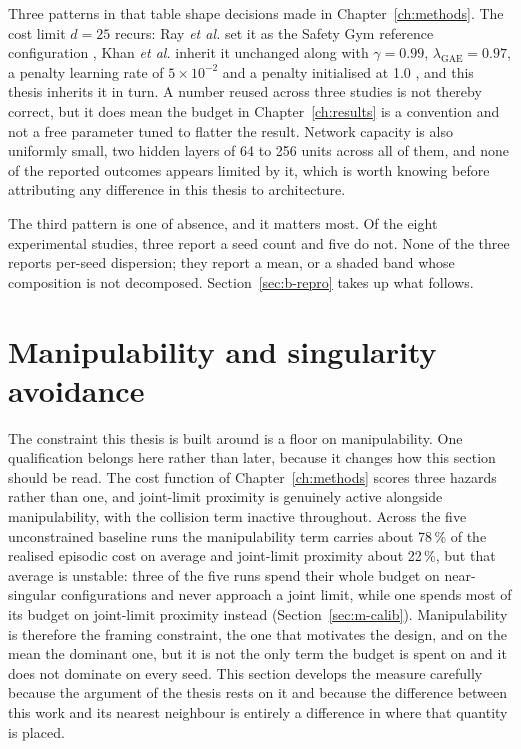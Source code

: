 Three patterns in that table shape decisions made in Chapter~\ref{ch:methods}. The cost limit
\(d=25\) recurs: Ray \emph{et al.} set it as the Safety Gym reference configuration
\cite{ray2019benchmarking}, Khan \emph{et al.} inherit it unchanged along with \(\gamma=0.99\),
\(\lambda_{\mathrm{GAE}}=0.97\), a penalty learning rate of \(5\times10^{-2}\) and a penalty
initialised at 1.0 \cite{khan2026rl_precision_grasping}, and this thesis inherits it in turn. A
number reused across three studies is not thereby correct, but it does mean the budget in
Chapter~\ref{ch:results} is a convention and not a free parameter tuned to flatter the result.
Network capacity is also uniformly small, two hidden layers of 64 to 256 units across all of
them, and none of the reported outcomes appears limited by it, which is worth knowing before
attributing any difference in this thesis to architecture.

The third pattern is one of absence, and it matters most. Of the eight experimental studies,
three report a seed count and five do not. None of the three reports per-seed dispersion; they
report a mean, or a shaded band whose composition is not decomposed. Section~\ref{sec:b-repro}
takes up what follows.

\section{Manipulability and singularity avoidance}\label{sec:b-manip}

The constraint this thesis is built around is a floor on manipulability. One qualification
belongs here rather than later, because it changes how this section should be read. The cost
function of Chapter~\ref{ch:methods} scores three hazards rather than one, and joint-limit
proximity is genuinely active alongside manipulability, with the collision term inactive
throughout. Across the five unconstrained baseline runs the manipulability term carries about
78\,\% of the realised episodic cost on average and joint-limit proximity about 22\,\%, but that
average is unstable: three of the five runs spend their whole budget on near-singular
configurations and never approach a joint limit, while one spends most of its budget on
joint-limit proximity instead (Section~\ref{sec:m-calib}). Manipulability is therefore the framing
constraint, the one that motivates the design, and on the mean the dominant one, but it is not the
only term the budget is spent on and it does not dominate on every seed. This section develops the
measure carefully because the argument of the thesis rests on it and because the difference between
this work and its nearest neighbour is entirely a difference in where that quantity is placed.

